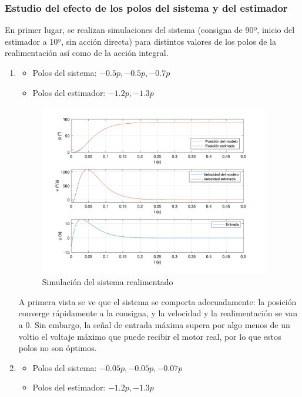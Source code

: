 \documentclass[a4paper, 12pt]{article}
\begin{document}
\subsubsection{Estudio del efecto de los polos del sistema y del estimador}
En primer lugar, se realizan simulaciones del sistema (consigna de 90º, inicio del estimador a 10º, sin acción directa) para distintos valores de los polos de la realimentación así como de la acción integral.  \\

\begin{enumerate}
	\item 
	\begin{itemize}
		\item Polos del sistema: $-0.5p, -0.5p, -0.7p$
		\item Polos del estimador: $-1.2p, -1.3p$
	\end{itemize}

\begin{figure}[H]
	\centering
	\includegraphics*[height = 7.5cm]{figs/p4/ki05}
	\caption{Simulación del sistema realimentado}
\end{figure}
A primera vista se ve que el sistema se comporta adecuadamente: la posición converge rápidamente a la consigna, y la velocidad y la realimentación se van a 0. Sin embargo, la señal de entrada máxima supera por algo menos de un voltio el voltaje máximo que puede recibir el motor real, por lo que estos polos no son óptimos. 
\item 
	\begin{itemize}
		\item Polos del sistema: $-0.05p, -0.05p, -0.07p$
		\item Polos del estimador: $-1.2p, -1.3p$
	\end{itemize}



\end{enumerate}
\end{document}
